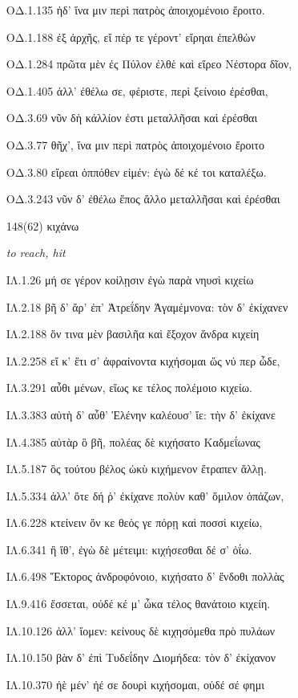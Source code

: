 \begin{enumerate}
{ΟΔ.1.135 ἠδ' ἵνα μιν περὶ πατρὸς ἀποιχομένοιο ἔροιτο.

ΟΔ.1.188 ἐξ ἀρχῆς, εἴ πέρ τε γέροντ' εἴρηαι ἐπελθὼν

ΟΔ.1.284 πρῶτα μὲν ἐς Πύλον ἐλθὲ καὶ εἴρεο Νέστορα δῖον,

ΟΔ.1.405 ἀλλ' ἐθέλω σε, φέριστε, περὶ ξείνοιο ἐρέσθαι,

ΟΔ.3.69 νῦν δὴ κάλλίον ἐστι μεταλλῆσαι καὶ ἐρέσθαι

ΟΔ.3.77 θῆχ', ἵνα μιν περὶ πατρὸς ἀποιχομένοιο ἔροιτο

ΟΔ.3.80 εἴρεαι ὁππόθεν εἰμέν: ἐγὼ δέ κέ τοι καταλέξω.

ΟΔ.3.243 νῦν δ' ἐθέλω ἔπος ἄλλο μεταλλῆσαι καὶ ἐρέσθαι

}

\clearpage
\item[\large 148(62)]{\large \g κιχάνω	}

\hspace{0.2cm} \textit{ to reach, hit }

{\g
ΙΛ.1.26 μή σε γέρον κοίλῃσιν ἐγὼ παρὰ νηυσὶ κιχείω

ΙΛ.2.18 βῆ δ' ἄρ' ἐπ' Ἀτρεΐδην Ἀγαμέμνονα: τὸν δ' ἐκίχανεν

ΙΛ.2.188 ὅν τινα μὲν βασιλῆα καὶ ἔξοχον ἄνδρα κιχείη

ΙΛ.2.258 εἴ κ' ἔτι σ' ἀφραίνοντα κιχήσομαι ὥς νύ περ ὧδε,

ΙΛ.3.291 αὖθι μένων, εἵως κε τέλος πολέμοιο κιχείω.

ΙΛ.3.383 αὐτὴ δ' αὖθ' Ἑλένην καλέουσ' ἴε: τὴν δ' ἐκίχανε

ΙΛ.4.385 αὐτὰρ ὃ βῆ, πολέας δὲ κιχήσατο Καδμεΐωνας

ΙΛ.5.187 ὃς τούτου βέλος ὠκὺ κιχήμενον ἔτραπεν ἄλλῃ.

ΙΛ.5.334 ἀλλ' ὅτε δή ῥ' ἐκίχανε πολὺν καθ' ὅμιλον ὀπάζων,

ΙΛ.6.228 κτείνειν ὅν κε θεός γε πόρῃ καὶ ποσσὶ κιχείω,

ΙΛ.6.341 ἢ ἴθ', ἐγὼ δὲ μέτειμι: κιχήσεσθαι δέ σ' ὀΐω.

ΙΛ.6.498 Ἕκτορος ἀνδροφόνοιο, κιχήσατο δ' ἔνδοθι πολλὰς

ΙΛ.9.416 ἔσσεται, οὐδέ κέ μ' ὦκα τέλος θανάτοιο κιχείη.

ΙΛ.10.126 ἀλλ' ἴομεν: κείνους δὲ κιχησόμεθα πρὸ πυλάων

ΙΛ.10.150 βὰν δ' ἐπὶ Τυδεΐδην Διομήδεα: τὸν δ' ἐκίχανον

ΙΛ.10.370 ἠὲ μέν' ἠέ σε δουρὶ κιχήσομαι, οὐδέ σέ φημι

}
\end{enumerate}
